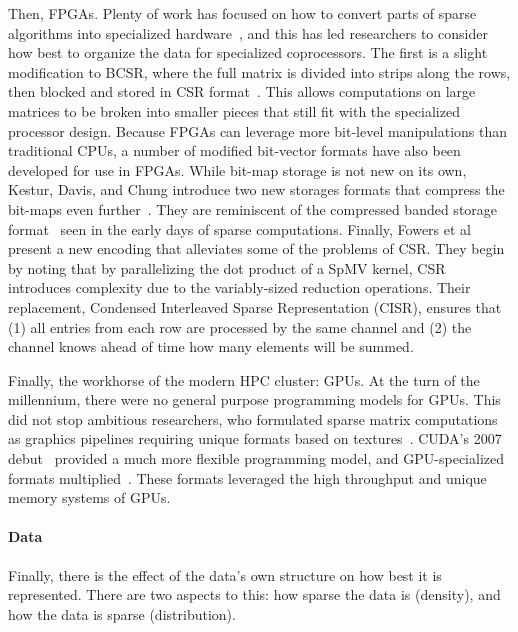Then, FPGAs.
Plenty of work has focused on how to convert parts of sparse algorithms into specialized hardware~\cite{elgindy2002sparse,zhuo2005sparse,gregg2007fpga,prasanna2007sparse,jain2020domain,kapre2009parallelizing}, and this has led researchers to consider how best to organize the data for specialized coprocessors. 
The first is a slight modification to BCSR, where the full matrix is divided into strips along the rows, then blocked and stored in CSR format~\cite{sun2007sparse}. 
This allows computations on large matrices to be broken into smaller pieces that still fit with the specialized processor design.
Because FPGAs can leverage more bit-level manipulations than traditional CPUs, a number of modified bit-vector formats have also been developed for use in FPGAs. 
While bit-map storage is not new on its own, Kestur, Davis, and Chung introduce two new storages formats that compress the bit-maps even further~\cite{kestur2012towards}.
They are reminiscent of the compressed banded storage format~\cite{jennings1966compact} seen in the early days of sparse computations.
Finally, Fowers et al~\cite{fowers2014high} present a new encoding that alleviates some of the problems of CSR\@.
They begin by noting that by parallelizing the dot product of a SpMV kernel, CSR introduces complexity due to the variably-sized reduction operations.
Their replacement, Condensed Interleaved Sparse Representation (CISR), ensures that (1) all entries from each row are processed by the same channel and (2) the channel knows ahead of time how many elements will be summed.

Finally, the workhorse of the modern HPC cluster: GPUs.
At the turn of the millennium, there were no general purpose programming models for GPUs. 
This did not stop ambitious researchers, who formulated sparse matrix computations as graphics pipelines requiring unique formats based on textures~\cite{bolz2003sparse,fan2004gpu}.
CUDA's 2007 debut~\cite{cuda2007v1.0} provided a much more flexible programming model, and GPU-specialized formats multiplied~\cite{bell2009implementing,bell2008efficient,monakov2010automatically}.
These formats leveraged the high throughput and unique memory systems of GPUs.

\paragraph{Data}

Finally, there is the effect of the data's own structure on how best it is represented.
There are two aspects to this: how sparse the data is (density), and how the data is sparse (distribution).


